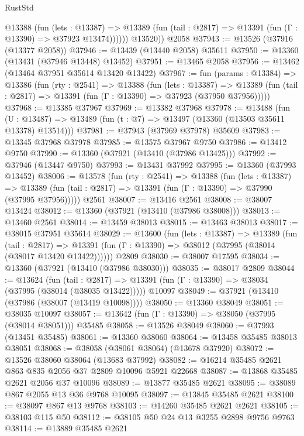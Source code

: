 \begin{lexlean}{RustStd}
\begin{coremodule}
            @13388
              (fun (lets : @13387) =>
              @13389 (fun (tail : @2817) => @13391 (fun (Γ : @13390) => @37923 @13474))))))
        @13520))
    @2058
@37943 := @13526 (@37916 (@13377 @2058))
@37946 := @13439 (@13440 @2058) @35611
@37950 := @13360 (@13431 (@37946 @13448) @13452)
@37951 := @13465 @2058
@37956 := @13462 (@13464 @37951 @35614 @13420 @13422)
@37967 := fun (params : @13384) =>
  @13386
    (fun (rty : @2541) =>
    @13388
      (fun (lets : @13387) =>
      @13389 (fun (tail : @2817) => @13391 (fun (Γ : @13390) => @37923 (@37950 @37956)))))
@37968 := @13385 @37967
@37969 := @13382 @37968
@37978 := @13488
    (fun (U : @13487) => @13489 (fun (t : @7) => @13497 (@13360 (@13503 @35611 @13378) @13514)))
@37981 := @37943 (@37969 @37978) @35609
@37983 := @13345 @37968 @37978
@37985 := @13575 @37967 @9750
@37986 := @13412 @9750
@37990 := @13360 (@37921 (@13410 (@37986 @13425)))
@37992 := @37946 (@13447 @9750)
@37993 := @13431 @37992
@37995 := @13360 (@37993 @13452)
@38006 := @13578
    (fun (rty : @2541) =>
    @13388
      (fun (lets : @13387) =>
      @13389 (fun (tail : @2817) => @13391 (fun (Γ : @13390) => @37990 (@37995 @37956)))))
    @2561
@38007 := @13416 @2561
@38008 := @38007 @13424
@38012 := @13360 (@37921 (@13410 (@37986 @38008)))
@38013 := @13460 @2561
@38014 := @13459 @38013
@38015 := @13463 @38013
@38017 := @38015 @37951 @35614
@38029 := @13600
    (fun (lets : @13387) =>
    @13389
      (fun (tail : @2817) =>
      @13391 (fun (Γ : @13390) => @38012 (@37995 (@38014 (@38017 @13420 @13422))))))
    @2809
@38030 := @38007 @17595
@38034 := @13360 (@37921 (@13410 (@37986 @38030)))
@38035 := @38017 @2809
@38044 := @13624
    (fun (tail : @2817) => @13391 (fun (Γ : @13390) => @38034 (@37995 (@38014 (@38035 @13422)))))
    @10097
@38049 := @37921 (@13410 (@37986 (@38007 (@13419 @10098))))
@38050 := @13360 @38049
@38051 := @38035 @10097
@38057 := @13642 (fun (Γ : @13390) => @38050 (@37995 (@38014 @38051))) @35485
@38058 := @13526 @38049
@38060 := @37993 (@13451 @35485)
@38061 := @13360 @38060
@38064 := @13458 @35485 @38013 @38051
@38068 := @38058 (@38061 @38064) (@13678 @37920)
@38072 := @13526 @38060 @38064 (@13683 @37992)
@38082 := @16214 @35485 @2621 @863 @835 @2056 @37 @2809 @10096 @5921 @22668
@38087 := @13868 @35485 @2621 @2056 @37 @10096
@38089 := @13877 @35485 @2621
@38095 := @38089 @867 @2055 @13 @36 @9768 @10095
@38097 := @13845 @35485 @2621
@38100 := @38097 @867 @13 @9768
@38103 := @14260 @35485 @2621 @2621
@38105 := @38103 @115 @50
@38112 := @38105 @50 @24 @13 @3255 @2898 @9756 @9763
@38114 := @13889 @35485 @2621

\end{coremodule}
\end{lexlean}
